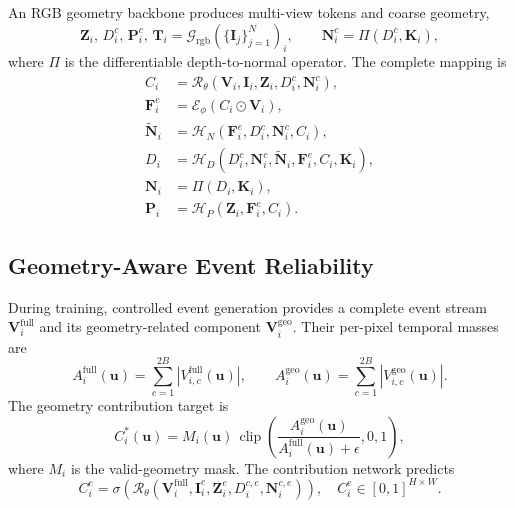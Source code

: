 An RGB geometry backbone produces multi-view tokens and coarse geometry,
\begin{equation}
    \bm Z_i,\,D_i^{c},\,\bm P_i^{c},\,\bm T_i
    =\mathcal{G}_{\mathrm{rgb}}
    (\{\bm I_j\}_{j=1}^{N})_i,
    \qquad
    \bm N_i^{c}=\Pi(D_i^{c},\bm K_i),
    \label{eq:rgb_coarse_geometry}
\end{equation}
where $\Pi$ is the differentiable depth-to-normal operator. The complete
mapping is
\begin{equation}
    \boxed{
    \begin{aligned}
        C_i & =\mathcal{R}_{\theta}
        (\bm V_i,\bm I_i,\bm Z_i,D_i^{c},\bm N_i^{c}),\\
        \bm F_i^{e} & =\mathcal{E}_{\phi}(C_i\odot\bm V_i),\\
        \widetilde{\bm N}_i & =
        \mathcal{H}_{N}(\bm F_i^{e},D_i^{c},\bm N_i^{c},C_i),\\
        D_i & =\mathcal{H}_{D}
        (D_i^{c},\bm N_i^{c},\widetilde{\bm N}_i,
         \bm F_i^{e},C_i,\bm K_i),\\
        \bm N_i & =\Pi(D_i,\bm K_i),\\
        \bm P_i & =\mathcal{H}_{P}(\bm Z_i,\bm F_i^{e},C_i).
    \end{aligned}}
    \label{eq:unified_pipeline}
\end{equation}


\subsection{Geometry-Aware Event Reliability}
\label{sec:event_reliability}

During training, controlled event generation provides a complete event stream
$\bm V_i^{\mathrm{full}}$ and its geometry-related component
$\bm V_i^{\mathrm{geo}}$. Their per-pixel temporal masses are
\begin{equation}
    A_i^{\mathrm{full}}(\bm u)=
    \sum_{c=1}^{2B}|V_{i,c}^{\mathrm{full}}(\bm u)|,
    \qquad
    A_i^{\mathrm{geo}}(\bm u)=
    \sum_{c=1}^{2B}|V_{i,c}^{\mathrm{geo}}(\bm u)|.
    \label{eq:event_masses}
\end{equation}
The geometry contribution target is
\begin{equation}
    C_i^{*}(\bm u)=
    M_i(\bm u)\,
    \operatorname{clip}\!\left(
    \frac{A_i^{\mathrm{geo}}(\bm u)}
    {A_i^{\mathrm{full}}(\bm u)+\epsilon},0,1\right),
    \label{eq:contribution_target}
\end{equation}
where $M_i$ is the valid-geometry mask. The contribution network predicts
\begin{equation}
    C_i^{e}=\sigma\!\left(
    \mathcal{R}_{\theta}
    (\bm V_i^{\mathrm{full}},\bm I_i^{e},
     \bm Z_i^{e},D_i^{c,e},\bm N_i^{c,e})\right),
    \quad C_i^{e}\in[0,1]^{H\times W}.
    \label{eq:contribution_prediction}
\end{equation}

